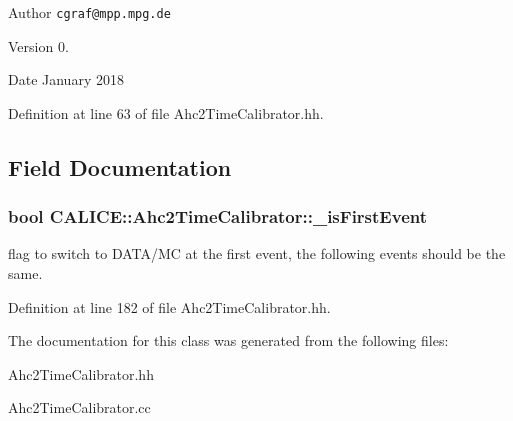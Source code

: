\begin{DoxyAuthor}{Author}
{\tt cgraf@mpp.\-mpg.\-de} 
\end{DoxyAuthor}
\begin{DoxyVersion}{Version}
0. 
\end{DoxyVersion}
\begin{DoxyDate}{Date}
January 2018 
\end{DoxyDate}


Definition at line 63 of file Ahc2\-Time\-Calibrator.\-hh.



\subsection{Field Documentation}
\subsubsection[{\-\_\-is\-First\-Event}]{\setlength{\rightskip}{0pt plus 5cm}bool C\-A\-L\-I\-C\-E\-::\-Ahc2\-Time\-Calibrator\-::\-\_\-is\-First\-Event\hspace{0.3cm}{\ttfamily [protected]}}\label{classCALICE_1_1Ahc2TimeCalibrator_a5f7e021c927d01063e9ec177deec463c}


flag to switch to D\-A\-T\-A/\-M\-C at the first event, the following events should be the same. 



Definition at line 182 of file Ahc2\-Time\-Calibrator.\-hh.



The documentation for this class was generated from the following files\-:\begin{DoxyCompactItemize}
\item 
Ahc2\-Time\-Calibrator.\-hh\item 
Ahc2\-Time\-Calibrator.\-cc\end{DoxyCompactItemize}
